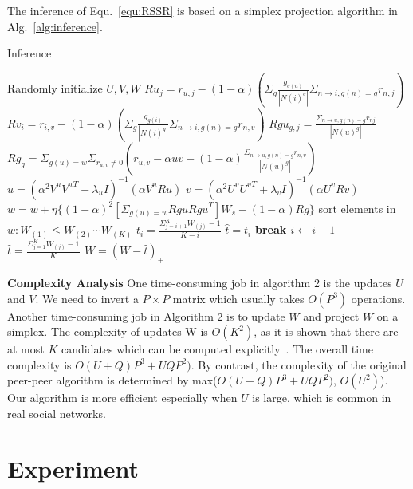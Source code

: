 \documentclass{ieeeaccess}
\begin{document}
The inference of Equ.~\ref{equ:RSSR} is based on a simplex projection algorithm in Alg.~\ref{alg:inference}.


\begin{algorithm}[htb!]
\caption{Inference}\label{alg:inference}
\begin{algorithmic}
\REQUIRE Randomly initialize $U,V,W$
\STATE $Ru_{j}=r_{u,j}-(1-\alpha)(\Sigma_g\frac{g_{g(u)}}{|N(i)^g|}\Sigma_{n\rightarrow i,g(n)=g} r_{n,j})$
\STATE  $Rv_{i}=r_{i,v}-(1-\alpha)(\Sigma_g\frac{g_{g(i)}}{|N(i)^g|}\Sigma_{n\rightarrow i,g(n)=g} r_{n,v})$
\STATE $Rgu_{g,j} = \frac{\Sigma_{n\rightarrow u, g(n)=g} r_{nj}}{|N(u)^g|}$
\STATE $Rg_g = \Sigma_{g(u)=w} \Sigma_{r_{u,v}\neq 0} (r_{u,v} -\alpha uv -(1-\alpha) \frac{\Sigma_{n\rightarrow u, g(n)=g} r_{n,v}}{|N(u)^g|})$
\STATE  $u= {(\alpha^2 V^u {V^u}^T +\lambda_u I)}^{-1} (\alpha V^u Ru)$
\STATE $v = {(\alpha^2 U^v {U^v}^T +\lambda_v I)}^{-1} (\alpha U^v Rv)$
\STATE $w= w+\eta \{{(1-\alpha)}^2 [\Sigma_{g(u)=w} Rgu {Rgu}^T] W_s-(1-\alpha)Rg\}$
\STATE sort elements in $w:W_{(1)}\leq W_{(2)}\cdots W_{(K)}$
\STATE $t_i = \frac{\Sigma_{j=i+1}^K W_{(j)}-1}{K-i}$
\STATE $\hat{t}=t_i$
\STATE  \bf{break}
\ELSE
\STATE $i \leftarrow i-1$
\ENDIF
\STATE $\hat{t}=\frac{\Sigma_{j=1}^K W_{(j)}-1}{K}$
\STATE $W=(W-\hat{t})_+$
\ENDFOR
\ENDFOR

\ENDWHILE
\end{algorithmic}
\end{algorithm}

\textbf{Complexity Analysis} One time-consuming job in algorithm 2 is the updates $U$ and $V$. We need to invert a $P\times P$ matrix which usually takes $O(P^3)$ operations. Another time-consuming job in Algorithm 2 is to update $W$ and project $W$ on a simplex. The complexity of updates W is $O(K^2)$, as it is shown that there are at most $K$ candidates which can be computed explicitly~\cite{Chen2011Projection}. The overall time complexity is $O(U+Q)P^3+UQP^2)$. By contrast, the complexity of the original peer-peer algorithm is determined by max($O(U+Q)P^3+UQP^2)$, $O(U^2)$). Our algorithm is more efficient especially when $U$ is large, which is common in real social networks.

\section{Experiment}\label{sec:experiment}
\end{document}
